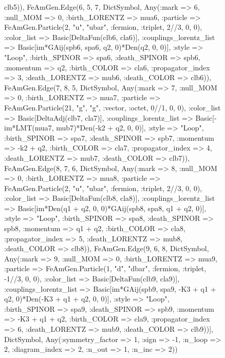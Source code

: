 \documentclass{revtex4}
\begin{document}
\begin{figure}[!htb]
\begin{center}
{clb5)), FeAmGen.Edge(6, 5, 7, Dict{Symbol, Any}(:mark => 6, :null_MOM => 0, :birth_LORENTZ => mua6, :particle => FeAmGen.Particle(2, "u", "ubar", :fermion, :triplet, 2//3, 0, 0), :color_list => Basic[DeltaFun(clb6, cla6)], :couplings_lorentz_list => Basic[im*GAij(spb6, spa6, q2, 0)*Den(q2, 0, 0)], :style => "Loop", :birth_SPINOR => spa6, :death_SPINOR => spb6, :momentum => q2, :birth_COLOR => cla6, :propagator_index => 3, :death_LORENTZ => mub6, :death_COLOR => clb6)), FeAmGen.Edge(7, 8, 5, Dict{Symbol, Any}(:mark => 7, :null_MOM => 0, :birth_LORENTZ => mua7, :particle => FeAmGen.Particle(21, "g", "g", :vector, :octet, 0//1, 0, 0), :color_list => Basic[DeltaAdj(clb7, cla7)], :couplings_lorentz_list => Basic[-im*LMT(mua7, mub7)*Den(-k2 + q2, 0, 0)], :style => "Loop", :birth_SPINOR => spa7, :death_SPINOR => spb7, :momentum => -k2 + q2, :birth_COLOR => cla7, :propagator_index => 4, :death_LORENTZ => mub7, :death_COLOR => clb7)), FeAmGen.Edge(8, 7, 6, Dict{Symbol, Any}(:mark => 8, :null_MOM => 0, :birth_LORENTZ => mua8, :particle => FeAmGen.Particle(2, "u", "ubar", :fermion, :triplet, 2//3, 0, 0), :color_list => Basic[DeltaFun(clb8, cla8)], :couplings_lorentz_list => Basic[im*Den(q1 + q2, 0, 0)*GAij(spb8, spa8, q1 + q2, 0)], :style => "Loop", :birth_SPINOR => spa8, :death_SPINOR => spb8, :momentum => q1 + q2, :birth_COLOR => cla8, :propagator_index => 5, :death_LORENTZ => mub8, :death_COLOR => clb8)), FeAmGen.Edge(9, 6, 8, Dict{Symbol, Any}(:mark => 9, :null_MOM => 0, :birth_LORENTZ => mua9, :particle => FeAmGen.Particle(1, "d", "dbar", :fermion, :triplet, -1//3, 0, 0), :color_list => Basic[DeltaFun(clb9, cla9)], :couplings_lorentz_list => Basic[im*GAij(spb9, spa9, -K3 + q1 + q2, 0)*Den(-K3 + q1 + q2, 0, 0)], :style => "Loop", :birth_SPINOR => spa9, :death_SPINOR => spb9, :momentum => -K3 + q1 + q2, :birth_COLOR => cla9, :propagator_index => 6, :death_LORENTZ => mub9, :death_COLOR => clb9))], Dict{Symbol, Any}(:symmetry_factor => 1, :sign => -1, :n_loop => 2, :diagram_index => 2, :n_out => 1, :n_inc => 2)) 
}
\end{center}
\end{figure}
\end{document}
